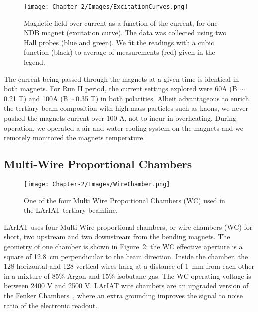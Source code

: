 \begin{figure}[!h]
\begin{centering}
\vspace{-0.3cm}
\texttt{[image: Chapter-2/Images/ExcitationCurves.png]}
\caption{
{ Magnetic field over current as a function of the current, for one NDB magnet (excitation curve). The data was collected using two Hall probes (blue and green). We fit the readings with a cubic function (black) to average of measurements (red) given in the legend.}
}
\label{fig:magnet_excitation}
\end{centering}
\end{figure}

The current being passed through the magnets at a given time is identical in both magnets. For Run II period, the current settings explored were 60A (B $\sim$0.21 T) and 100A (B $\sim$0.35 T) in both polarities. 
Albeit advantageous to enrich the tertiary beam composition with high mass particles such as kaons, we never pushed the magnets current over 100 A, not to incur in overheating.  During operation, we operated a air and water cooling system on the magnets and we remotely monitored the magnets temperature.
 
\subsection{Multi-Wire Proportional Chambers}\label{sec:MWPC}
\begin{figure}[!h]
\begin{centering}
\vspace{-0.3cm}
\texttt{[image: Chapter-2/Images/WireChamber.png]}
\caption{
{One of the four Multi Wire Proportional Chambers (WC) used in the LArIAT tertiary beamline.}
}
\label{fig:wirechamber}
\end{centering}
\end{figure}

LArIAT uses four Multi-Wire proportional chambers, or wire chambers (WC) for short, two upstream and two downstream from the bending magnets. The geometry of one chamber is shown in Figure~\ref{fig:wirechamber}: the WC effective aperture is a square of  12.8~cm perpendicular to the beam direction.  Inside the chamber, the 128 horizontal and 128 vertical wires hang at a distance of 1~mm from each other in a mixture of 85\% Argon and 15\% isobutane gas.  The WC operating voltage is between 2400 V and 2500 V. LArIAT wire chambers are an upgraded version of the Fenker Chambers~\cite{Fenker}, where an extra grounding improves the signal to noise ratio of the electronic readout.  

